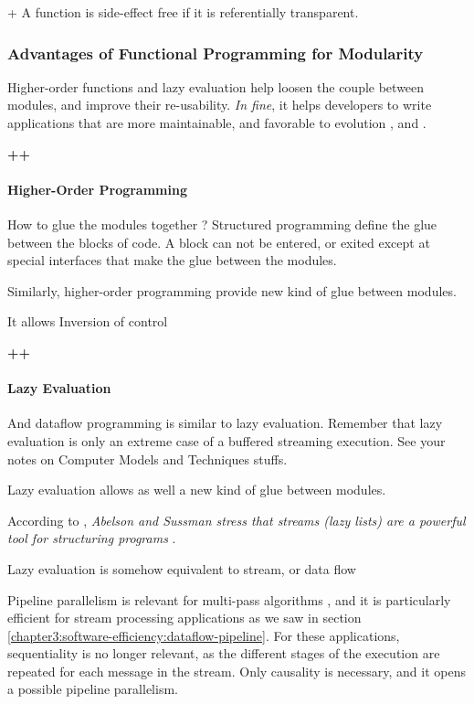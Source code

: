 + A function is side-effect free if it is referentially transparent.


\subsubsection{Advantages of Functional Programming for Modularity}

Higher-order functions and lazy evaluation help loosen the couple between modules, and improve their re-usability.
\textit{In fine}, it helps developers to write applications that are more maintainable, and favorable to evolution \cite{Hughes1989}, and \cite{Turner1981}.

\textbf{++}

\paragraph{Higher-Order Programming}

How to glue the modules together ?
Structured programming define the glue between the blocks of code.
A block can not be entered, or exited except at special interfaces that make the glue between the modules.

Similarly, higher-order programming provide new kind of glue between modules.



It allows Inversion of control

\textbf{++}


\paragraph{Lazy Evaluation}

And dataflow programming is similar to lazy evaluation.
Remember that lazy evaluation is only an extreme case of a buffered streaming execution.
See your notes on Computer Models and Techniques stuffs.

Lazy evaluation allows as well a new kind of glue between modules.

According to \cite{Hughes1989}, \textit{Abelson and Sussman stress that streams (lazy lists) are a powerful tool for structuring programs} \cite{Sussman1983}.

Lazy evaluation is somehow equivalent to stream, or data flow

Pipeline parallelism is relevant for multi-pass algorithms \cite{Conway1963}, and it is particularly efficient for stream processing applications as we saw in section \ref{chapter3:software-efficiency:dataflow-pipeline}.
For these applications, sequentiality is no longer relevant, as the different stages of the execution are repeated for each message in the stream.
Only causality is necessary, and it opens a possible pipeline parallelism.

